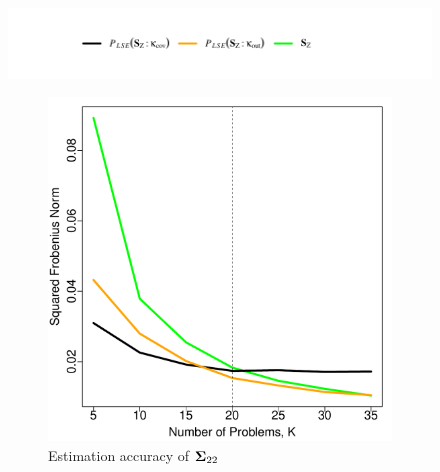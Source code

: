 \documentclass[11pt]{article}
\theoremstyle{definition}
\theoremstyle{definition}
\def\bSigma{{\bf \Sigma}}
\begin{document}
\begin{figure}[t!]
\vspace{-2em}
\centering
\hspace*{1em} 	\includegraphics{legendSim.pdf} %
\vspace{-4em}

        \begin{subfigure}{0.5\textwidth}
                \includegraphics[width=\textwidth]{simResSigma.pdf}
                \caption{Estimation accuracy of $\bSigma_{22}$}
                \label{Sigma}
        \end{subfigure}%
        \begin{subfigure}{0.5\textwidth}

\end{subfigure}
\end{figure}
\end{document}
